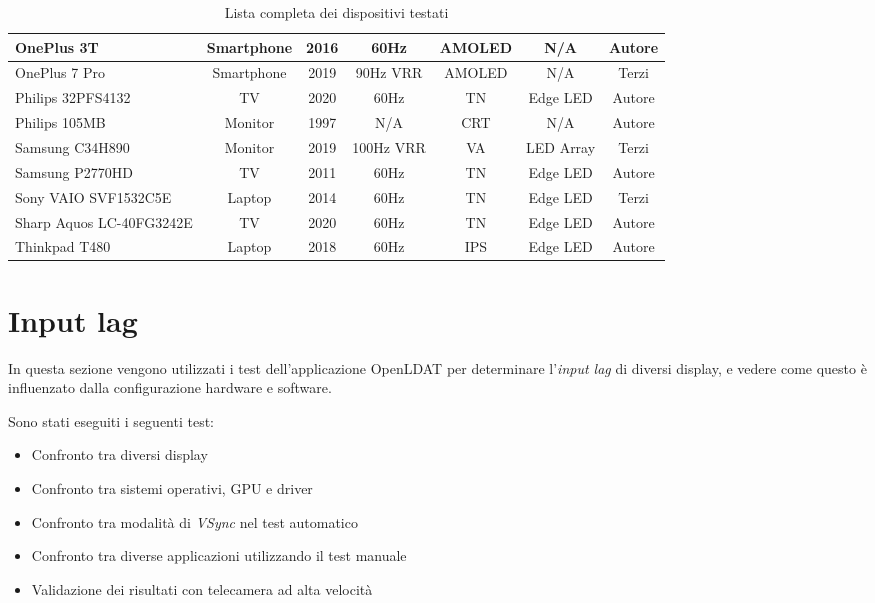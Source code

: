 \begin{landscape}
\begin{table}[h!]
{\begin{tabular}{|l|c|c|c|c|c|c|}
        OnePlus 3T & Smartphone & 2016 & 60Hz & AMOLED & N/A & Autore \\ \hline
        OnePlus 7 Pro & Smartphone & 2019 & 90Hz VRR & AMOLED & N/A & Terzi \\ \hline
        Philips 32PFS4132 & TV & 2020 & 60Hz & TN & Edge LED & Autore \\ \hline
        Philips 105MB & Monitor & 1997 & N/A & CRT & N/A & Autore \\ \hline
        Samsung C34H890 & Monitor & 2019 & 100Hz VRR & VA & LED Array & Terzi \\ \hline
        Samsung P2770HD & TV & 2011 & 60Hz & TN & Edge LED & Autore \\ \hline
        Sony VAIO SVF1532C5E & Laptop & 2014 & 60Hz & TN & Edge LED & Terzi \\ \hline
        Sharp Aquos LC-40FG3242E & TV & 2020 & 60Hz & TN & Edge LED & Autore \\ \hline
        Thinkpad T480 & Laptop & 2018 & 60Hz & IPS & Edge LED & Autore \\ \hline
    \end{tabular}}
	\caption{\label{tab:display_list}Lista completa dei dispositivi testati}
\end{table}
\end{landscape}

\section{Input lag}
In questa sezione vengono utilizzati i test dell'applicazione OpenLDAT per determinare l'\textit{input lag} di diversi display, e vedere come questo è influenzato dalla configurazione hardware e software.

Sono stati eseguiti i seguenti test:\begin{itemize}
	\item Confronto tra diversi display
	\item Confronto tra sistemi operativi, GPU e driver
	\item Confronto tra modalità di \textit{VSync} nel test automatico
	\item Confronto tra diverse applicazioni utilizzando il test manuale
	\item Validazione dei risultati con telecamera ad alta velocità
\end{itemize}

